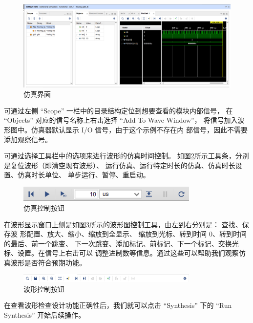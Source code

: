 \documentclass[ichigo,normal,cn]{elegantnote_mod}
\begin{document}
\begin{figure}[!htbp]
    \centering
    \includegraphics[width=1\textwidth]{fig/Sim1}
    \caption{仿真界面}
    \label{fig:Sim1}
\end{figure}

可通过左侧 “Scope” 一栏中的目录结构定位到想要查看的模块内部信号，
在 “Objects” 对应的信号名称上右击选择 “Add To Wave Window”，
将信号加入波形图中。仿真器默认显示 I/O 信号，由于这个示例不存在内
部信号，因此不需要添加观察信号。

可通过选择工具栏中的选项来进行波形的仿真时间控制。
如图\ref{fig:Sim2}所示工具条，分别是复位波形（即清空现有波形）、
运行仿真、运行特定时长的仿真、仿真时长设置、仿真时长单位、
单步运行、暂停、重启动。

\begin{figure}[!htbp]
    \centering
    \includegraphics[width=0.8\textwidth]{fig/Sim2}
    \caption{仿真控制按钮}
    \label{fig:Sim2}
\end{figure}

在波形显示窗口上侧是如图\ref{fig:Sim3}所示的波形图控制工具，由左到右分别是：
查找、保存波 形配置、放大、缩小、缩放到全显示、
缩放到光标、转到时间 0、转到时间的最后、前一个跳变、
下一次跳变、添加标记、前标记、下一个标记、交换光标、设置。在信号上右击可以
调整进制数等信息。通过这些可以帮助我们观察仿真波形是否符合预期功能。

\begin{figure}[!htbp]
    \centering
    \includegraphics[width=0.8\textwidth]{fig/Sim3}
    \caption{波形控制按钮}
    \label{fig:Sim3}
\end{figure}

在查看波形检查设计功能正确性后，我们就可以点击 “Synthesis” 下的 
“Run Synthesis” 开始后续操作。
\end{document}
